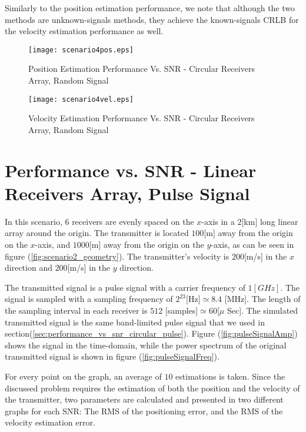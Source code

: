 Similarly to the position estimation performance, we note that although the two methods are unknown-signals methods, they achieve the known-signals CRLB for the velocity estimation performance as well. 

\begin{figure}
\begin{center}
\texttt{[image: scenario4pos.eps]} 
\end{center}
\caption{Position Estimation Performance Vs. SNR - Circular Receivers Array, Random Signal}
\label{fig:scenario4_pos_rms}
\end{figure}

\begin{figure}
\begin{center}
\texttt{[image: scenario4vel.eps]} 
\end{center}
\caption{Velocity Estimation Performance Vs. SNR - Circular Receivers Array, Random Signal}
\label{fig:scenario4_vel_rms}
\end{figure}


\section{Performance vs. SNR - Linear Receivers Array, Pulse Signal}

In this scenario, $6$ receivers are evenly spaced on the $x$-axis in a $2$[km] long linear array around the origin.
The transmitter is located $100$[m] away from the origin on the $x$-axis, and $1000$[m] away from the origin on the $y$-axis, as can be seen in figure (\ref{fig:scenario2_geometry}).
The transmitter's velocity is $200$[m/s] in the $x$ direction and $200$[m/s] in the $y$ direction.

The transmitted signal is a pulse signal with a carrier frequency of $1[GHz]$.
The signal is sampled with a sampling frequency of $2^{23}$[Hz]$ \simeq 8.4$ [MHz].
The length of the sampling interval in each receiver is $512$ [samples]$ \simeq 60 $[$\mu$ Sec].
The simulated transmitted signal is the same band-limited pulse signal that we used in section(\ref{sec:performance_vs_snr_circular_pulse}). Figure (\ref{fig:pulseSignalAmp}) shows the signal in the time-domain, while the power spectrum of the original transmitted signal is shown in figure (\ref{fig:pulseSignalFreq}).

For every point on the graph, an average of $10$ estimations is taken.
Since the discussed problem requires the estimation of both the position and the velocity of the transmitter, two parameters are calculated and presented in two different graphs for each SNR: The RMS of the positioning error, and the RMS of the velocity estimation error.

